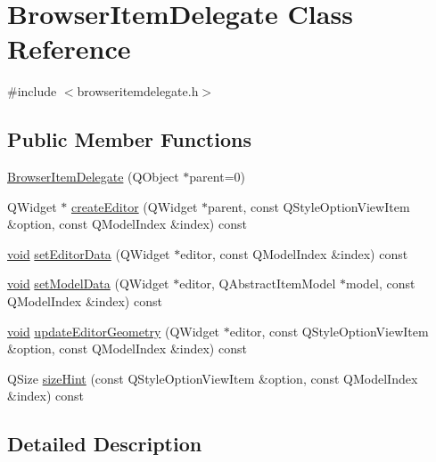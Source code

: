 \hypertarget{class_browser_item_delegate}{\section{\-Browser\-Item\-Delegate \-Class \-Reference}
\label{class_browser_item_delegate}
}


{\ttfamily \#include $<$browseritemdelegate.\-h$>$}

\subsection*{\-Public \-Member \-Functions}
\begin{DoxyCompactItemize}
\item 
\hyperlink{group___u_a_v_object_browser_plugin_gacfb0653f39791c3fb6b7b59ce4de990c}{\-Browser\-Item\-Delegate} (\-Q\-Object $\ast$parent=0)
\item 
\-Q\-Widget $\ast$ \hyperlink{group___u_a_v_object_browser_plugin_ga16c2a6f63557c8fe5ade68a4b8f43009}{create\-Editor} (\-Q\-Widget $\ast$parent, const \-Q\-Style\-Option\-View\-Item \&option, const \-Q\-Model\-Index \&index) const 
\item 
\hyperlink{group___u_a_v_objects_plugin_ga444cf2ff3f0ecbe028adce838d373f5c}{void} \hyperlink{group___u_a_v_object_browser_plugin_ga07845c2f048ab9c2344102bbfb627b01}{set\-Editor\-Data} (\-Q\-Widget $\ast$editor, const \-Q\-Model\-Index \&index) const 
\item 
\hyperlink{group___u_a_v_objects_plugin_ga444cf2ff3f0ecbe028adce838d373f5c}{void} \hyperlink{group___u_a_v_object_browser_plugin_ga14d19cdeeb41b7891318f803d87fa585}{set\-Model\-Data} (\-Q\-Widget $\ast$editor, \-Q\-Abstract\-Item\-Model $\ast$model, const \-Q\-Model\-Index \&index) const 
\item 
\hyperlink{group___u_a_v_objects_plugin_ga444cf2ff3f0ecbe028adce838d373f5c}{void} \hyperlink{group___u_a_v_object_browser_plugin_gaf2e600876c101b4bf562057c6aeeade1}{update\-Editor\-Geometry} (\-Q\-Widget $\ast$editor, const \-Q\-Style\-Option\-View\-Item \&option, const \-Q\-Model\-Index \&index) const 
\item 
\-Q\-Size \hyperlink{group___u_a_v_object_browser_plugin_gaed46b06e0a245805247c1be3c62f97ee}{size\-Hint} (const \-Q\-Style\-Option\-View\-Item \&option, const \-Q\-Model\-Index \&index) const 
\end{DoxyCompactItemize}


\subsection{\-Detailed \-Description}


